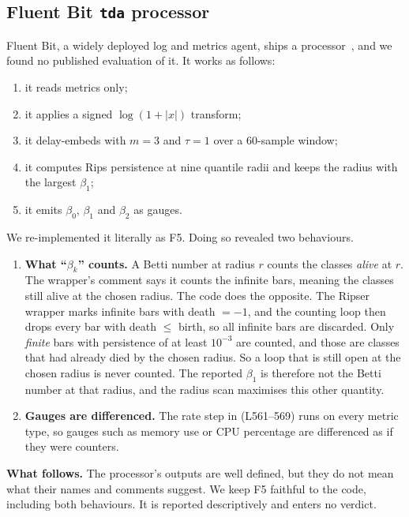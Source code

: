\subsection{Fluent Bit \texttt{tda} processor}
\label{sec:fluentbit}
Fluent Bit, a widely deployed log and metrics agent, ships a  processor~\cite{fluentbit_pr11250}, and we found no published evaluation of it. It works as follows:
\begin{enumerate}
  \item it reads metrics only;
  \item it applies a signed $\log(1+|x|)$ transform;
  \item it delay-embeds with $m=3$ and $\tau=1$ over a 60-sample window;
  \item it computes Rips persistence at nine quantile radii and keeps the radius with the largest $\beta_1$;
  \item it emits $\beta_0$, $\beta_1$ and $\beta_2$ as gauges.
\end{enumerate}
We re-implemented it literally as F5. Doing so revealed two behaviours.

\begin{enumerate}
  \item \textbf{What ``$\beta_k$'' counts.} A Betti number at radius $r$ counts the classes \emph{alive} at $r$. The wrapper's comment says it counts the infinite bars, meaning the classes still alive at the chosen radius. The code does the opposite. The Ripser wrapper marks infinite bars with death $=-1$, and the counting loop then drops every bar with death $\le$ birth, so all infinite bars are discarded. Only \emph{finite} bars with persistence of at least $10^{-3}$ are counted, and those are classes that had already died by the chosen radius. So a loop that is still open at the chosen radius is never counted. The reported $\beta_1$ is therefore not the Betti number at that radius, and the radius scan maximises this other quantity. 
  \item \textbf{Gauges are differenced.} The rate step in  (L561--569) runs on every metric type, so gauges such as memory use or CPU percentage are differenced as if they were counters.
\end{enumerate}
\textbf{What follows.} The processor's outputs are well defined, but they do not mean what their names and comments suggest. We keep F5 faithful to the code, including both behaviours. It is reported descriptively and enters no verdict.

